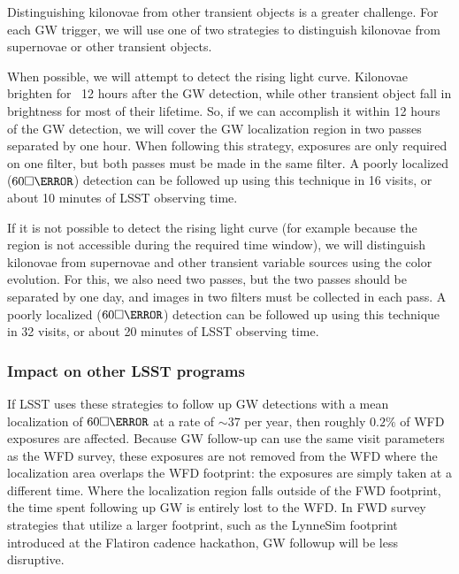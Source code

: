 Distinguishing kilonovae from other transient objects is a greater challenge. For each GW trigger, we will use one of two strategies to distinguish kilonovae from supernovae or other transient objects.

When possible, we will attempt to detect the rising light curve. Kilonovae brighten for ~12 hours after the GW detection, while other transient object fall in brightness for most of their lifetime. So, if we can accomplish it within 12 hours of the GW detection, we will cover the GW localization region in two passes separated by one hour. When following this strategy, exposures are only required on one filter, but both passes must be made in the same filter. A poorly localized ($60 \square\degree$) detection can be followed up using this technique in 16 visits, or about 10 minutes of LSST observing time.


If it is not possible to detect the rising light curve (for example because the region is not accessible during the required time window), we will distinguish kilonovae from supernovae and other transient variable sources using the color evolution. For this, we also need two passes, but the two passes should be separated by one day, and images in two filters must be collected in each pass. A poorly localized ($60 \square\degree$) detection can be followed up using this technique in 32 visits, or about 20 minutes of LSST observing time.



\subsubsection{Impact on other LSST programs}

If LSST uses these strategies to follow up GW detections with a mean localization of $60\square\degree$ at a rate of $\sim 37$ per year, then roughly $0.2\%$ of WFD exposures are affected. Because GW follow-up can use the same visit parameters as the WFD survey, these exposures are not removed from the WFD where the localization area overlaps the WFD footprint: the exposures are simply taken at a different time. Where the localization region falls outside of the FWD footprint, the time spent following up GW is entirely lost to the WFD. In FWD survey strategies that utilize a larger footprint, such as the LynneSim footprint introduced at the Flatiron cadence hackathon, GW followup will be less disruptive. 

